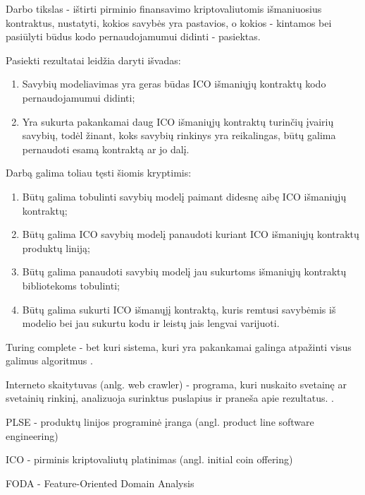 \documentclass{VUMIFPSkursinis}
\begin{document}
Darbo tikslas - ištirti pirminio finansavimo kriptovaliutomis išmaniuosius kontraktus, nustatyti, kokios savybės yra pastavios, o kokios - kintamos bei pasiūlyti būdus kodo pernaudojamumui didinti - pasiektas.

\bigbreak

Pasiekti rezultatai leidžia daryti išvadas:
\begin{enumerate}[topsep=0pt,itemsep=-1ex,partopsep=1ex,parsep=1ex]
\item Savybių modeliavimas yra geras būdas ICO išmaniųjų kontraktų kodo pernaudojamumui didinti;
\item Yra sukurta pakankamai daug ICO išmaniųjų kontraktų turinčių įvairių savybių, todėl žinant, koks savybių rinkinys yra reikalingas, būtų galima pernaudoti esamą kontraktą ar jo dalį.
\end{enumerate}

\bigbreak

Darbą galima toliau tęsti šiomis kryptimis:
\begin{enumerate}[topsep=0pt,itemsep=-1ex,partopsep=1ex,parsep=1ex]
\item Būtų galima tobulinti savybių modelį paimant didesnę aibę ICO išmaniųjų kontraktų;
\item Būtų galima ICO savybių modelį panaudoti kuriant ICO išmaniųjų kontraktų produktų liniją;
\item Būtų galima panaudoti savybių modelį jau sukurtoms išmaniųjų kontraktų bibliotekoms tobulinti;
\item Būtų galima sukurti ICO išmanųjį kontraktą, kuris remtusi savybėmis iš modelio bei jau sukurtu kodu ir leistų jais lengvai varijuoti.
\end{enumerate}


\printbibliography[heading=bibintoc] %

Turing complete - bet kuri sistema, kuri yra pakankamai galinga atpažinti visus galimus algoritmus \cite{Teller1994}. 

Interneto skaitytuvas (anlg. web crawler) -  programa, kuri nuskaito svetainę ar svetainių rinkinį, analizuoja surinktus puslapius ir praneša apie rezultatus. \cite{Thelwall2001}.

PLSE - produktų linijos programinė įranga (angl. product line software engineering)

ICO - pirminis kriptovaliutų platinimas (angl. initial coin offering)

FODA - Feature-Oriented Domain Analysis \cite{Kang1990}
\end{document}
